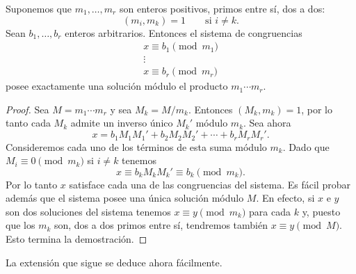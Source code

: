 \documentclass[12pt,a4paper]{book}
\begin{document}
    \begin{teorema}
        Suponemos que $m_{1},\dots,m_{r}$ son enteros positivos, primos entre sí, dos a dos:
        \begin{equation*}
            (m_{i},m_{k})=1\qquad\text{si }i\neq k.
        \end{equation*}
        Sean $b_{1},\dots,b_{r}$ enteros arbitrarios. Entonces el sistema de congruencias
        \begin{gather*}
            x\equiv b_{1}\pmod{m_{1}}\\
            \vdots\\
            x\equiv b_{r}\pmod{m_{r}}
        \end{gather*}
        posee exactamente una solución módulo el producto $m_{1}\cdots m_{r}$.
    \end{teorema}

    \begin{proof}
        Sea $M=m_{1}\cdots m_{r}$ y sea $M_{k}=M/m_{k}$. Entonces $(M_{k},m_{k})=1$, por lo tanto cada
        $M_{k}$ admite un inverso único $M_{k}'$ módulo $m_{k}$. Sea ahora
        \begin{equation*}
            x=b_{1}M_{1}M_{1}'+b_{2}M_{2}M_{2}'+\cdots+b_{r}M_{r}M_{r}'.
        \end{equation*}
        Consideremos cada uno de los términos de esta suma módulo $m_{k}$. Dado que
        $M_{i}\equiv0\pmod{m_{k}}$ si $i\neq k$ tenemos
        \begin{equation*}
            x\equiv b_{k}M_{k}M_{k}'\equiv b_{k}\pmod{m_{k}}.
        \end{equation*}
        Por lo tanto $x$ satisface cada una de las congruencias del sistema. Es fácil
        probar además que el sistema posee una única solución módulo $M$. En efecto, si
        $x$ e $y$ son dos soluciones del sistema tenemos $x\equiv y\pmod{m_{k}}$ para cada
        $k$ y, puesto que los $m_{k}$ son, dos a dos primos entre sí, tendremos también
        $x\equiv y\pmod{M}$. Esto termina la demostración.
    \end{proof}

    La extensión que sigue se deduce ahora fácilmente.
\end{document}
